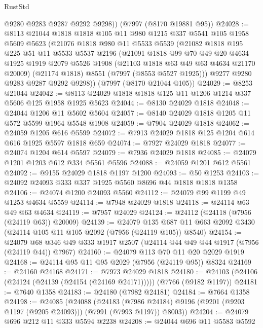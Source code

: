 \begin{lexlean}{RustStd}
\begin{coremodule}
        @9280
        @9283
        @9287
        @9292
        @9298))
    (@7997 (@8170 @19881 @95))
@24028 := @8113
    @21044
    @1818
    @1818
    @105
    @11
    @980
    @1215
    @337
    @5541
    @105
    @1958
    @5609
    @5623
    (@21076
      @1818
      @980
      @11
      @5533
      @5539
      (@21082
        @1818
        @195
        @225
        @51
        @11
        @5533
        @5537
        @2196
        (@21091
          @1818
          @99
          @70
          @49
          @20
          @4634
          @1925
          @1919
          @2079
          @5526
          @1908
          (@21103 @1818 @63 @49 @63 @4634 @21170 @20009)
          (@21174 @1818)
          @8551
          (@7997 (@8553 @5527 @1925)))
        @9277
        @9280
        @9283
        @9287
        @9292
        @9298))
    (@7997 (@8170 @21044 @105))
@24029 := @8253 @21044
@24042 := @8113 @24029 @1818 @1818 @125 @11 @1206 @1214 @337 @5606 @125 @1958 @1925 @5623
@24044 := @8130 @24029 @1818
@24048 := @24044 @1206 @11 @5602 @5604
@24057 := @8140 @24029 @1818 @1205 @11 @572 @5599 @1964 @5548 @1908
@24059 := @7904 @24029 @1818
@24062 := @24059 @1205 @616 @5599
@24072 := @7913 @24029 @1818 @125 @1204 @614 @616 @1925 @5597 @1818 @659
@24074 := @7927 @24029 @1818
@24077 := @24074 @1204 @614 @5597
@24079 := @7936 @24029 @1818
@24085 := @24079 @1201 @1203 @612 @334 @5561 @5596
@24088 := @24059 @1201 @612 @5561
@24092 := @9155 @24029 @1818 @1197 @1200
@24093 := @50 @1253
@24103 := @24092 @24093 @333 @337 @1925 @5560 @8696 @44 @1818 @1818 @1358
@24106 := @24074 @1200 @24093 @5560
@24112 := @24079 @99 @1199 @49 @1253 @4634 @5559
@24114 := @7948 @24029 @1818
@24118 := @24114 @63 @49 @63 @4634
@24119 := @7957 @24029
@24124 := @24112 (@24118 (@7956 (@24119 @63)) @20009)
@24139 := @24079
    @135
    @687
    @11
    @663
    @2092
    @3430
    (@24114 @105 @11 @105 @2092 (@7956 (@24119 @105)) @8540)
@24154 := @24079 @68 @346 @49 @333 @1917 @2507 (@24114 @44 @49 @44 @1917 (@7956 (@24119 @44)) @7967)
@24160 := @24079 @113 @70 @11 @20 @2029 @1919
@24168 := @24114 @95 @11 @95 @2029 (@7956 (@24119 @95)) @8324
@24169 := @24160 @24168
@24171 := @7973 @24029 @1818
@24180 := @24103 (@24106 (@24124 (@24139 (@24154 (@24169 @24171))))) (@7766 (@9182 @1197))
@24181 := @7640 @1358
@24183 := @24180 (@7982 @24181)
@24184 := @7664 @1358
@24198 := @24085
    (@24088
      (@24183
        (@7986 @24184)
        @9196
        (@9201 (@9203 @1197 (@9205 @24093)))
        (@7991 (@7993 @1197))
        @8003))
@24204 := @24079 @696 @212 @11 @333 @5594 @2238
@24208 := @24044 @696 @11 @5583 @5592

\end{coremodule}
\end{lexlean}
